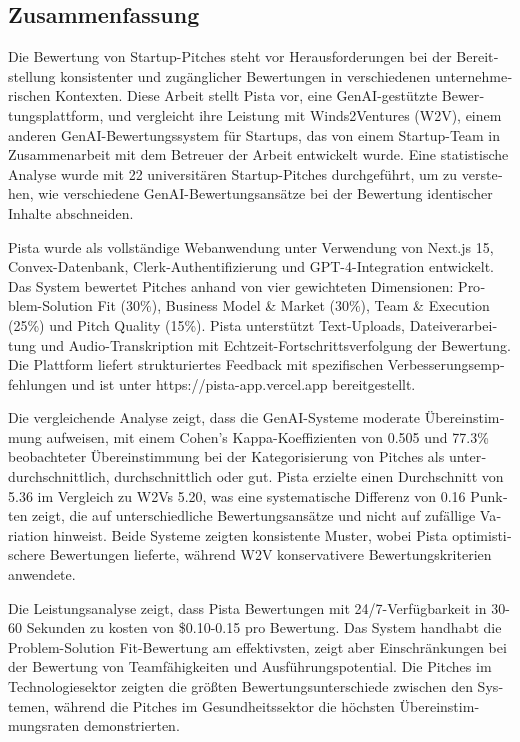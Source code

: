 \begin{otherlanguage}{ngerman}
\chapter*{Zusammenfassung}

Die Bewertung von Startup-Pitches steht vor Herausforderungen bei der Bereitstellung konsistenter und zugänglicher Bewertungen in verschiedenen unternehmerischen Kontexten. Diese Arbeit stellt Pista vor, eine GenAI-gestützte Bewertungsplattform, und vergleicht ihre Leistung mit Winds2Ventures (W2V), einem anderen GenAI-Bewertungssystem für Startups, das von einem Startup-Team in Zusammenarbeit mit dem Betreuer der Arbeit entwickelt wurde. Eine statistische Analyse wurde mit 22 universitären Startup-Pitches durchgeführt, um zu verstehen, wie verschiedene GenAI-Bewertungsansätze bei der Bewertung identischer Inhalte abschneiden.

Pista wurde als vollständige Webanwendung unter Verwendung von Next.js 15, Convex-Datenbank, Clerk-Authentifizierung und GPT-4-Integration entwickelt. Das System bewertet Pitches anhand von vier gewichteten Dimensionen: Problem-Solution Fit (30\%), Business Model \& Market (30\%), Team \& Execution (25\%) und Pitch Quality (15\%). Pista unterstützt Text-Uploads, Dateiverarbeitung und Audio-Transkription mit Echtzeit-Fortschrittsverfolgung der Bewertung. Die Plattform liefert strukturiertes Feedback mit spezifischen Verbesserungsempfehlungen und ist unter https://pista-app.vercel.app bereitgestellt.

Die vergleichende Analyse zeigt, dass die GenAI-Systeme moderate Übereinstimmung aufweisen, mit einem Cohen's Kappa-Koeffizienten von 0.505 und 77.3\% beobachteter Übereinstimmung bei der Kategorisierung von Pitches als unterdurchschnittlich, durchschnittlich oder gut. Pista erzielte einen Durchschnitt von 5.36 im Vergleich zu W2Vs 5.20, was eine systematische Differenz von 0.16 Punkten zeigt, die auf unterschiedliche Bewertungsansätze und nicht auf zufällige Variation hinweist. Beide Systeme zeigten konsistente Muster, wobei Pista optimistischere Bewertungen lieferte, während W2V konservativere Bewertungskriterien anwendete.

Die Leistungsanalyse zeigt, dass Pista Bewertungen mit 24/7-Verfügbarkeit in 30-60 Sekunden zu kosten von \$0.10-0.15 pro Bewertung. Das System handhabt die Problem-Solution Fit-Bewertung am effektivsten, zeigt aber Einschränkungen bei der Bewertung von Teamfähigkeiten und Ausführungspotential. Die Pitches im Technologiesektor zeigten die größten Bewertungsunterschiede zwischen den Systemen, während die Pitches im Gesundheitssektor die höchsten Übereinstimmungsraten demonstrierten.


\end{otherlanguage}

